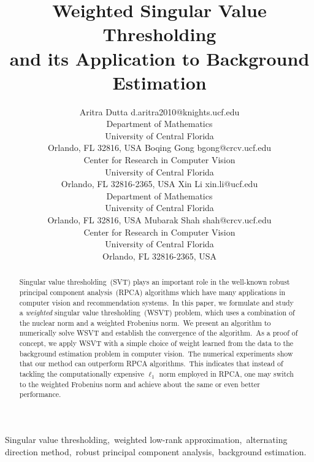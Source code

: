 \documentclass[twoside,11pt]{article}
\begin{document}
\title{Weighted Singular Value Thresholding\\ and its Application to Background Estimation}

\author{\name Aritra Dutta \email d.aritra2010@knights.ucf.edu \\
       \addr Department of Mathematics\\
       University of Central Florida\\
       Orlando, FL 32816, USA
       \AND
       \name Boqing Gong \email  bgong@crcv.ucf.edu\\
       \addr Center for Research in Computer Vision\\
       University of Central Florida\\
       Orlando, FL 32816-2365, USA
       \AND
       \name Xin Li  \email xin.li@ucf.edu\\
       \addr Department of Mathematics\\
       University of Central Florida\\
       Orlando, FL 32816, USA
       \AND 
       \name Mubarak Shah \email shah@crcv.ucf.edu\\
       \addr Center for Research in Computer Vision\\
       University of Central Florida\\
       Orlando, FL 32816-2365, USA}
       
       

\maketitle

\begin{abstract}%
Singular value thresholding~(SVT) plays an important role in the well-known robust principal component analysis~(RPCA) algorithms which have many applications in computer vision and recommendation systems.~In this paper, we formulate and study a {\it weighted} singular value thresholding~(WSVT) problem, which uses a combination of the nuclear norm and a weighted Frobenius norm.~We present an algorithm to numerically solve WSVT and establish the convergence of the algorithm.~As a proof of concept, we apply WSVT with a simple choice of weight learned from the data to the background estimation problem in computer vision.~The numerical experiments show that our method can outperform RPCA algorithms.~This indicates that instead of tackling the computationally expensive $\ell_1$ norm employed in RPCA, one may switch to the weighted Frobenius norm and achieve about the same or even better performance. 
\end{abstract}
\begin{keywords}
Singular value thresholding,~weighted low-rank approximation,~alternating direction method,~robust principal component analysis,~background estimation.
\end{keywords}
\end{document}
